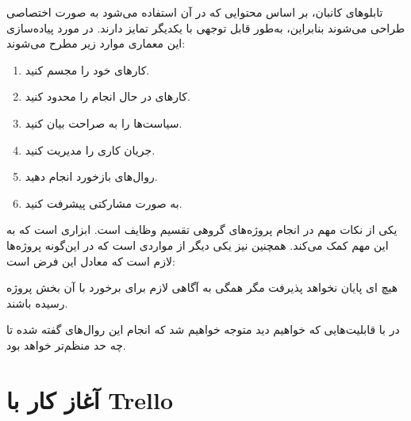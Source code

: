 \documentclass[]{article}
\begin{document}
تابلوهای کانبان، بر اساس محتوایی که در آن استفاده می‌شود به صورت اختصاصی طراحی می‌شوند بنابراین، به‌طور قابل توجهی با یکدیگر تمایز دارند. در مورد پیاده‌سازی این معماری موارد زیر مطرح می‌شوند:

\begin{enumerate}
\item
کارهای خود را مجسم کنید.

\item
کارهای در حال انجام را محدود کنید.

\item
سیاست‌ها را به صراحت بیان کنید.

\item
جریان کاری را مدیریت کنید.

\item
روال‌های بازخورد انجام دهید.

\item
به صورت مشارکتی پیشرفت کنید.

\end{enumerate}

یکی از نکات مهم در انجام پروژه‌های گروهی تقسیم وظایف است.  ابزاری است که به این مهم کمک می‌کند. همچنین
 نیز یکی دیگر از مواردی است که در این‌گونه پروژه‌ها  لازم است که معادل این فرض است:

هیچ  ای پایان نخواهد پذیرفت مگر همگی به آگاهی لازم برای برخورد با آن بخش پروژه رسیده باشند.

در  با قابلیت‌هایی که خواهیم دید متوجه خواهیم شد که انجام این روال‌های گفته شده تا چه حد منظم‌تر خواهد بود.

\newpage

\section*{{\titr آغاز کار با Trello}}
\end{document}
